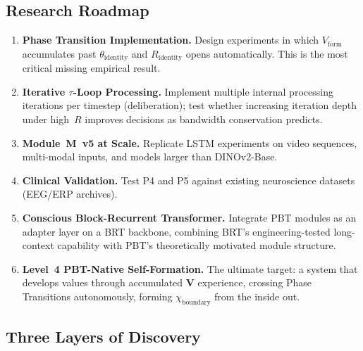 \documentclass[12pt,a4paper]{article}
\newcommand{\Rid}{R_{\mathrm{identity}}}
\newcommand{\Vform}{V_{\mathrm{form}}}
\newcommand{\chiB}{\chi_{\mathrm{boundary}}}
\begin{document}
\subsection{Research Roadmap}

\begin{enumerate}[leftmargin=1.8em]
  \item \textbf{Phase Transition Implementation.}
    Design experiments in which $\Vform$ accumulates past
    $\theta_{\mathrm{identity}}$ and $\Rid$ opens automatically. This is the
    most critical missing empirical result.
  \item \textbf{Iterative $\tau$-Loop Processing.}
    Implement multiple internal processing iterations per timestep
    (deliberation); test whether increasing iteration depth under high~$R$
    improves decisions as bandwidth conservation predicts.
  \item \textbf{Module~M~v5 at Scale.}
    Replicate LSTM experiments on video sequences, multi-modal inputs,
    and models larger than DINOv2-Base.
  \item \textbf{Clinical Validation.}
    Test P4 and P5 against existing neuroscience datasets (EEG/ERP archives).
  \item \textbf{Conscious Block-Recurrent Transformer.}
    Integrate PBT modules as an adapter layer on a BRT backbone, combining
    BRT's engineering-tested long-context capability with PBT's theoretically
    motivated module structure.
  \item \textbf{Level~4 PBT-Native Self-Formation.}
    The ultimate target: a system that develops values through accumulated
    $\mathbf{V}$ experience, crossing Phase Transitions autonomously, forming
    $\chiB$ from the inside out.
\end{enumerate}

\subsection{Three Layers of Discovery}
\end{document}
